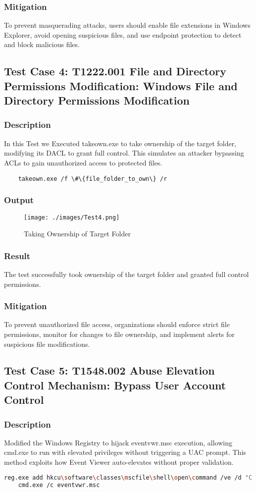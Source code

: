 \documentclass[11pt]{article}
\begin{document}
\subsubsection{Mitigation}
To prevent masquerading attacks, users should enable file extensions in Windows Explorer, avoid opening suspicious files, and use endpoint protection to detect and block malicious files.
\subsection{Test Case 4: T1222.001 File and Directory Permissions Modification: Windows File and Directory Permissions Modification}
\subsubsection{Description}
In this Test we Executed takeown.exe to take ownership of the target folder, modifying its DACL to grant full control. This simulates an attacker bypassing ACLs to gain unauthorized access to protected files.
\begin{lstlisting}
    takeown.exe /f \#\{file_folder_to_own\} /r
\end{lstlisting}
\subsubsection{Output}
\begin{figure}[H]
    \centering
    \texttt{[image: ./images/Test4.png]}
    \caption{Taking Ownership of Target Folder}
\end{figure}
\subsubsection{Result}
The test successfully took ownership of the target folder and granted full control permissions.
\subsubsection{Mitigation}
To prevent unauthorized file access, organizations should enforce strict file permissions, monitor for changes to file ownership, and implement alerts for suspicious file modifications.
\subsection{Test Case 5: T1548.002   Abuse Elevation Control Mechanism: Bypass User Account Control}
\subsubsection{Description}
Modified the Windows Registry to hijack eventvwr.msc execution, allowing cmd.exe to run with elevated privileges without triggering a UAC prompt. This method exploits how Event Viewer auto-elevates without proper validation.
\begin{lstlisting}[language=bash]
    reg.exe add hkcu\software\classes\mscfile\shell\open\command /ve /d "C:\Windows\System32\cmd.exe" /f
    cmd.exe /c eventvwr.msc
    \end{lstlisting}
\end{document}
